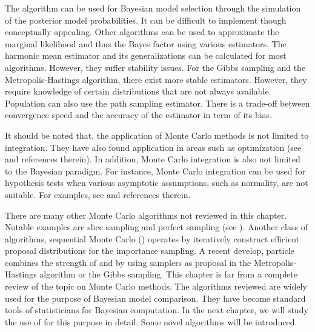 The \rjmcmc algorithm can be used for Bayesian model selection through the
simulation of the posterior model probabilities. It can be difficult to
implement though conceptually appealing. Other algorithms can be used to
approximate the marginal likelihood and thus the Bayes factor using various
estimators. The harmonic mean estimator and its generalizations can be
calculated for most \mcmc algorithms. However, they suffer stability issues.
For the Gibbs sampling and the Metropolis-Hastings algorithm, there exist
more stable estimators. However, they require knowledge of certain
distributions that are not always available. Population \mcmc can also use
the path sampling estimator. There is a trade-off between convergence speed
and the accuracy of the estimator in term of its bias.

It should be noted that, the application of Monte Carlo methods is not limited
to integration. They have also found application in areas such as optimization
(see \cite[][chap.~5]{Robert:2004tn} and references therein). In addition,
Monte Carlo integration is also not limited to the Bayesian paradigm. For
instance, Monte Carlo integration can be used for hypothesis tests when
various asymptotic assumptions, such as normality, are not suitable. For
examples, see \cite[][sec.~3.2]{Robert:2004tn} and references therein.

There are many other Monte Carlo algorithms not reviewed in this chapter.
Notable examples are slice sampling and perfect sampling (see \cite[][chap.~8
and~13]{Robert:2004tn}). Another class of algorithms, sequential Monte Carlo
(\smc) operates by iteratively construct efficient proposal distributions for
the importance sampling. A recent develop, particle \mcmc
\cite{Andrieu:2010gc} combines the strength of \mcmc and \smc by using \smc
samplers as proposal in the Metropolis-Hastings algorithm or the Gibbs
sampling. This chapter is far from a complete review of the topic on Monte
Carlo methods. The algorithms reviewed are widely used for the purpose of
Bayesian model comparison. They have become standard tools of statisticians
for Bayesian computation. In the next chapter, we will study the use of \smc
for this purpose in detail. Some novel algorithms will be introduced.
